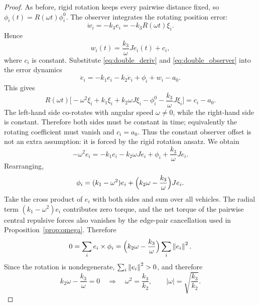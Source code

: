 \begin{proof}
As before, rigid rotation keeps every pairwise distance fixed, so $\phi_i(t)=R(\omega t)\phi_i^0$.
The observer integrates the rotating position error:
\begin{equation}
  \dot{w}_i=-k_3e_i=-k_3R(\omega t)\xi_i .
\end{equation}
Hence
\begin{equation}
  w_i(t)=\frac{k_3}{\omega}J e_i(t)+c_i,
  \label{eq:double_observer}
\end{equation}
where $c_i$ is constant. Substitute \eqref{eq:double_deriv} and \eqref{eq:double_observer} into the
error dynamics
\begin{equation}
  \ddot{e}_i=-k_1e_i-k_2\dot{e}_i+\phi_i+w_i-a_0 .
\end{equation}
This gives
\begin{equation}
  R(\omega t)\bigl[-\omega^2\xi_i+k_1\xi_i+k_2\omega J\xi_i-
  \phi_i^0-\frac{k_3}{\omega}J\xi_i\bigr]=c_i-a_0 .
\end{equation}
The left-hand side co-rotates with angular speed $\omega\ne0$, while the right-hand side is constant.
Therefore both sides must be constant in time; equivalently the rotating coefficient must vanish and
$c_i=a_0$. Thus the constant observer offset is not an extra assumption: it is forced by the rigid
rotation ansatz. We obtain
\begin{equation}
  -\omega^2 e_i = -k_1 e_i - k_2\omega J e_i + \phi_i + \frac{k_3}{\omega} J e_i .
  \label{eq:double_balance}
\end{equation}
Rearranging,
\begin{equation}
  \phi_i = (k_1-\omega^2) e_i + \Bigl(k_2\omega-\frac{k_3}{\omega}\Bigr) J e_i .
  \label{eq:double_phi}
\end{equation}
Take the cross product of $e_i$ with both sides and sum over all vehicles. The radial term
$(k_1-\omega^2)e_i$ contributes zero torque, and the net torque of the pairwise central repulsive
forces also vanishes by the edge-pair cancellation used in Proposition~\ref{prop:omega}. Therefore
\begin{equation}
  0=\sum_i e_i\times\phi_i
  =\Bigl(k_2\omega-\frac{k_3}{\omega}\Bigr)\sum_i \left\| e_i \right\|^2 .
  \label{eq:double_torque_sum}
\end{equation}
Since the rotation is nondegenerate, $\sum_i\left\| e_i \right\|^2>0$, and therefore
\begin{equation}
  \boxed{\; k_2\omega-\frac{k_3}{\omega}=0\quad\Longrightarrow\quad
  \omega^2=\frac{k_3}{k_2},\qquad |\omega|=\sqrt{\frac{k_3}{k_2}}.\;}
  \label{eq:double_omega}
\end{equation}
\end{proof}

